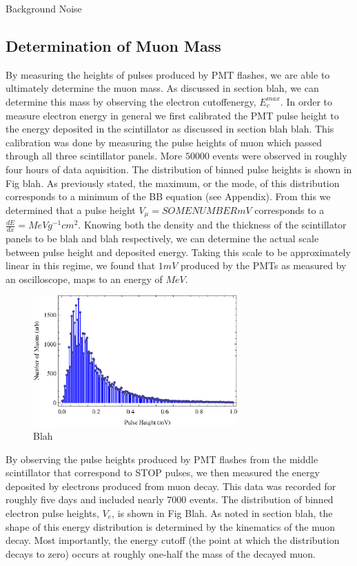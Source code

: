 Background Noise

\subsection{Determination of Muon Mass}

By measuring the heights of pulses produced by PMT flashes, we are
able to ultimately determine the muon mass.  As discussed in section
blah, we can determine this mass by observing the electron cutoffenergy, $E_{e}^{max}$. In order to measure electron energy in general
we first calibrated the PMT pulse height to the energy deposited in
the scintillator as discussed in section blah blah. This calibration
was done by measuring the pulse heights of muon which passed through
all three scintillator panels.  More $50000$ events were observed in
roughly four hours of data aquisition.  The distribution of binned
pulse heights is shown in Fig blah.  As previously stated, the
maximum, or the mode, of this distribution corresponds to a minimum of
the BB equation (see Appendix).  From this we determined that a pulse
height $V_{\mu} = SOME NUMBER mV$ corresponds to a $\frac{dE}{dx}= MeV
g^{-1} cm^{2}$.  Knowing both the density and the thickness of the
scintillator panels to be blah and blah respectively, we can determine
the actual scale between pulse height and deposited energy.  Taking
this scale to be approximately linear in this regime, we found that
$1mV$ produced by the PMTs as measured by an oscilloscope, maps to an
energy of $MeV$.


\begin{figure}[htbp]
\begin{center}
\includegraphics[height=50mm]{./figures/Muon_Pulse_Height.eps}
\caption{Blah}
\label{figure:logic}
\end{center}
\end{figure}

By observing the pulse heights produced by PMT flashes from the middle scintillator that correspond to STOP pulses, we then measured the energy deposited by electrons produced from muon decay.  This data was recorded for roughly five days and included nearly $7000$ events.  The distribution of binned electron pulse heights, $V_{e}$, is shown in Fig Blah.  As noted in section blah, the shape of this energy distribution is determined by the kinematics of the muon decay.  Most importantly, the energy cutoff (the point at which the distribution decays to zero) occurs at roughly one-half the mass of the decayed muon.

